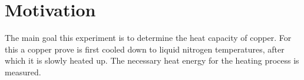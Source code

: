 \section{Motivation}
\label{sec:ziel}
The main goal this experiment is to determine the heat capacity of copper.
For this a copper prove is first cooled down to liquid nitrogen temperatures, after which it is slowly heated up.
The necessary heat energy for the heating process is measured.